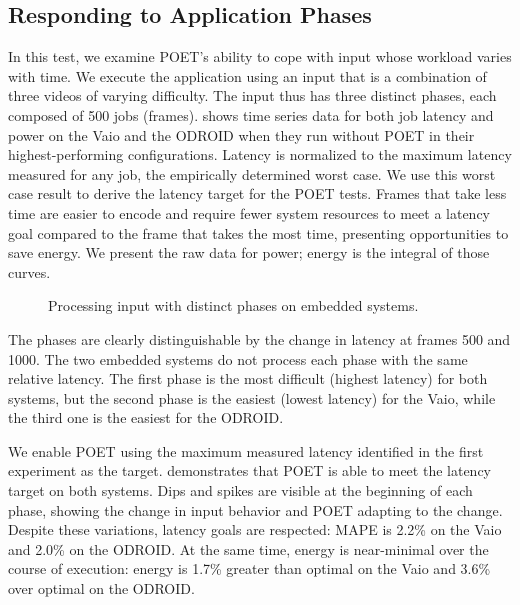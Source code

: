 \subsection{Responding to Application Phases}

In this test, we examine POET's ability to cope with input whose workload varies with time.
We execute the  application using an input that is a combination of three videos of varying difficulty.
The input thus has three distinct phases, each composed of 500 jobs (frames).
 shows time series data for both job latency and power on the Vaio and the ODROID when they run without POET in their highest-performing configurations.
Latency is normalized to the maximum latency measured for any job, \ie the empirically determined worst case.
We use this worst case result to derive the latency target for the POET tests.
Frames that take less time are easier to encode and require fewer system resources to meet a latency goal compared to the frame that takes the most time, presenting opportunities to save energy.
We present the raw data for power; energy is the integral of those curves.

\begin{figure}[t]
  \centering
  \newline
  \caption{Processing  input with distinct phases on embedded systems.}
  \label{fig:poet-embedded-phases}
\end{figure}

The phases are clearly distinguishable by the change in latency at frames 500 and 1000.
The two embedded systems do not process each phase with the same relative latency.
The first phase is the most difficult (highest latency) for both systems, but the second phase is the easiest (lowest latency) for the Vaio, while the third one is the easiest for the ODROID.

We enable POET using the maximum measured latency identified in the first experiment as the target.
 demonstrates that POET is able to meet the latency target on both systems.
Dips and spikes are visible at the beginning of each phase, showing the change in input behavior and POET adapting to the change.
Despite these variations, latency goals are respected: MAPE is 2.2\% on the Vaio and 2.0\% on the ODROID.
At the same time, energy is near-minimal over the course of execution: energy is 1.7\% greater than optimal on the Vaio and 3.6\% over optimal on the ODROID.


